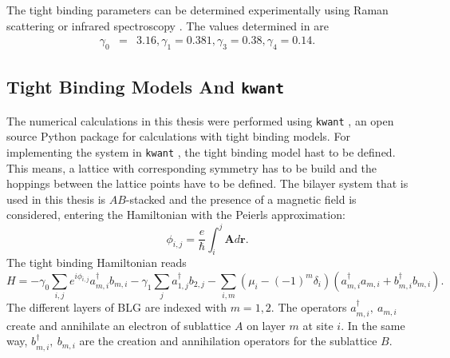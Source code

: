 The tight binding parameters can be determined experimentally using Raman scattering \cite{Malard2007} or infrared spectroscopy \cite{Kuzmenko2009}. The values determined in \cite{Kuzmenko2009} are
\begin{eqnarray}
\gamma_0 &=& 3.16,
\gamma_1 = 0.381, 
\gamma_3 = 0.38,
\gamma_4 = 0.14.
\end{eqnarray}

\subsection{Tight Binding Models And \texttt{kwant}}
The numerical calculations in this thesis were performed using \texttt{kwant} \cite{Groth2014}, an open source Python package for calculations with tight binding models. For implementing the system in \texttt{kwant} , the tight binding model hast to be defined. This means,  a lattice with corresponding symmetry has to be build and the hoppings between the lattice points have to be defined. The bilayer system that is used in this thesis is $AB$-stacked and the presence of a magnetic field is considered, entering the Hamiltonian with the Peierls approximation:
\begin{equation}
\phi_{i, j} = \frac{e}{\hbar} \int_i^j \mathbf{A} d\mathbf{r}.
\end{equation}
The tight binding Hamiltonian reads
\begin{equation}
H = - \gamma_0 \sum_{i, j} e^{i \phi_{i, j }} a^\dagger_{m, i} b_{m, i} - \gamma_1 \sum_j a_{1, j}^\dagger b_{2, j} - \sum_{i, m} \left( \mu_i - (-1)^m \delta_i\right) \left(a^\dagger_{m, i} a_{m, i} + b^\dagger_{m, i} b_{m, i} \right).
\end{equation}
The different layers of BLG are indexed with $m = 1, 2$. The operators $a^\dagger_{m, i},\ a_{m, i}$ create and annihilate an electron of sublattice $A$ on layer $m$ at site $i$. In the same way, $b^\dagger_{m, i},\ b_{m, i}$ are the creation and annihilation operators for the sublattice $B$.
